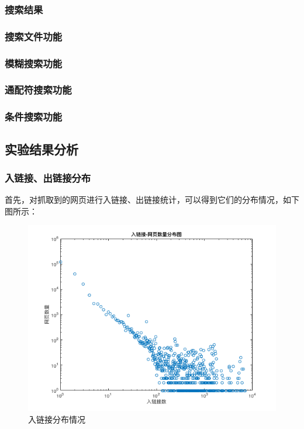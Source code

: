 \documentclass[paper=a4, fontsize=11pt, UTF8]{article} %
\numberwithin{equation}{section} %
\numberwithin{figure}{section} %
\numberwithin{table}{section} %
\begin{document}
\subsubsection{搜索结果}

\subsubsection{搜索文件功能}

\subsubsection{模糊搜索功能}

\subsubsection{通配符搜索功能}

\subsubsection{条件搜索功能}


\subsection{实验结果分析}

\subsubsection{入链接、出链接分布}

首先，对抓取到的网页进行入链接、出链接统计，可以得到它们的分布情况，如下图所示：

\begin{figure}[htp]
\center
\includegraphics[scale=0.5]{in_degree}
\caption{入链接分布情况}
\end{figure}
\end{document}
